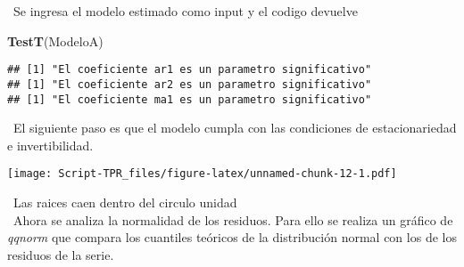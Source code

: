 \documentclass[]{article}
\newenvironment{Shaded}{\begin{snugshade}}{\end{snugshade}}
\newcommand{\ControlFlowTok}[1]{\textcolor[rgb]{0.13,0.29,0.53}{\textbf{#1}}}
\newcommand{\DecValTok}[1]{\textcolor[rgb]{0.00,0.00,0.81}{#1}}
\newcommand{\KeywordTok}[1]{\textcolor[rgb]{0.13,0.29,0.53}{\textbf{#1}}}
\newcommand{\NormalTok}[1]{#1}
\newcommand{\OperatorTok}[1]{\textcolor[rgb]{0.81,0.36,0.00}{\textbf{#1}}}
\newcommand{\StringTok}[1]{\textcolor[rgb]{0.31,0.60,0.02}{#1}}
\begin{document}
\begin{Shaded}
\end{Shaded}

~Se ingresa el modelo estimado como input y el codigo devuelve

\begin{Shaded}
\begin{Highlighting}[]
\KeywordTok{TestT}\NormalTok{(ModeloA)}
\end{Highlighting}
\end{Shaded}

\begin{verbatim}
## [1] "El coeficiente ar1 es un parametro significativo"
## [1] "El coeficiente ar2 es un parametro significativo"
## [1] "El coeficiente ma1 es un parametro significativo"
\end{verbatim}

~El siguiente paso es que el modelo cumpla con las condiciones de
estacionariedad e invertibilidad.

\texttt{[image: Script-TPR\_files/figure-latex/unnamed-chunk-12-1.pdf]}

~Las raices caen dentro del circulo unidad\\
\hspace*{0.333em} ~Ahora se analiza la normalidad de los residuos. Para
ello se realiza un gráfico de \emph{qqnorm} que compara los cuantiles
teóricos de la distribución normal con los de los residuos de la serie.
\end{document}
